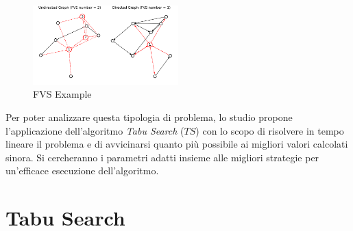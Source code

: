 \documentclass[a4paper, 10pt]{article}
\begin{document}
\begin{figure}[H]
    \centering
    \includegraphics[width=0.50\textwidth]{./img/800px-Feedback_vertex_set.png}
    \caption{FVS Example}
    \label{fig:fvs_example}
\end{figure}

\noindent
Per poter analizzare questa tipologia di problema, lo studio propone l'applicazione dell'algoritmo \textit{Tabu Search} ($TS$) con lo scopo di risolvere in tempo lineare il problema e di avvicinarsi quanto più possibile ai migliori valori calcolati sinora. Si cercheranno i parametri adatti insieme alle migliori strategie per un'efficace esecuzione dell'algorit\-mo.


\section{Tabu Search}\label{s:2}
\end{document}
